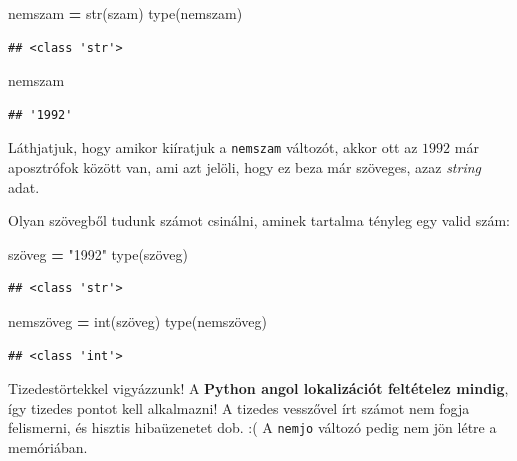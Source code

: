 \documentclass[
]{book}
\newenvironment{Shaded}{\begin{snugshade}}{\end{snugshade}}
\newcommand{\BuiltInTok}[1]{#1}
\newcommand{\NormalTok}[1]{#1}
\newcommand{\OperatorTok}[1]{\textcolor[rgb]{0.81,0.36,0.00}{\textbf{#1}}}
\newcommand{\StringTok}[1]{\textcolor[rgb]{0.31,0.60,0.02}{#1}}
\begin{document}
\begin{Shaded}
\begin{Highlighting}[]
\NormalTok{nemszam }\OperatorTok{=} \BuiltInTok{str}\NormalTok{(szam)}
\BuiltInTok{type}\NormalTok{(nemszam)}
\end{Highlighting}
\end{Shaded}

\begin{verbatim}
## <class 'str'>
\end{verbatim}

\begin{Shaded}
\begin{Highlighting}[]
\NormalTok{nemszam}
\end{Highlighting}
\end{Shaded}

\begin{verbatim}
## '1992'
\end{verbatim}

Láthjatjuk, hogy amikor kiíratjuk a \texttt{nemszam} változót, akkor ott az \(1992\) már aposztrófok között van, ami azt jelöli, hogy ez beza már szöveges, azaz \emph{string} adat.

Olyan szövegből tudunk számot csinálni, aminek tartalma tényleg egy valid szám:

\begin{Shaded}
\begin{Highlighting}[]
\NormalTok{szöveg }\OperatorTok{=} \StringTok{"1992"}
\BuiltInTok{type}\NormalTok{(szöveg)}
\end{Highlighting}
\end{Shaded}

\begin{verbatim}
## <class 'str'>
\end{verbatim}

\begin{Shaded}
\begin{Highlighting}[]
\NormalTok{nemszöveg }\OperatorTok{=} \BuiltInTok{int}\NormalTok{(szöveg)}
\BuiltInTok{type}\NormalTok{(nemszöveg)}
\end{Highlighting}
\end{Shaded}

\begin{verbatim}
## <class 'int'>
\end{verbatim}

Tizedestörtekkel vigyázzunk! A \textbf{Python angol lokalizációt feltételez mindig}, így tizedes pontot kell alkalmazni! A tizedes vesszővel írt számot nem fogja felismerni, és hisztis hibaüzenetet dob. :( A \texttt{nemjo} változó pedig nem jön létre a memóriában.
\end{document}
